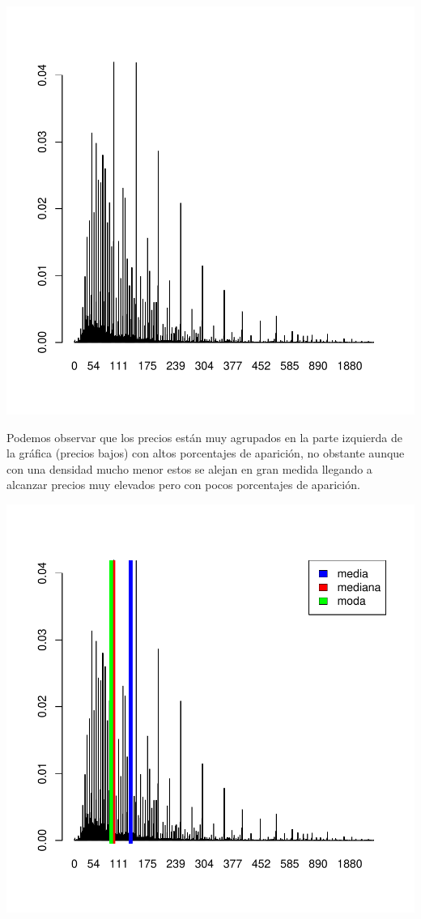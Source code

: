 \documentclass [a4paper] {article}
\begin{document}
\begin{center}
\begin{center}
\includegraphics{entrega-frecuencia_relativa_BNB_plot}
\end{center}

Podemos observar que los precios están muy agrupados en la parte izquierda de la gráfica (precios bajos) con altos porcentajes de aparición,
no obstante aunque con una densidad mucho menor estos se alejan en gran medida llegando a alcanzar precios muy elevados pero con pocos porcentajes de aparición.

\begin{center}
\includegraphics{entrega-estadisticos_BNB_plot}
\end{center}


\end{center}
\end{document}
